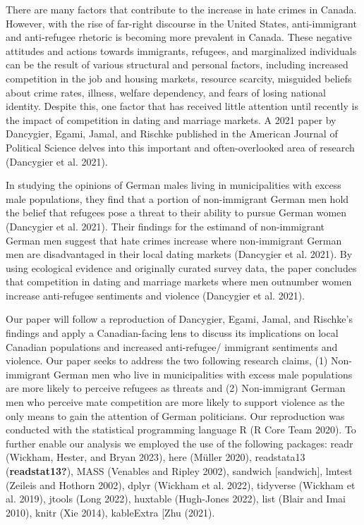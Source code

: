 \documentclass[
]{article}
\begin{document}
There are many factors that contribute to the increase in hate crimes in
Canada. However, with the rise of far-right discourse in the United
States, anti-immigrant and anti-refugee rhetoric is becoming more
prevalent in Canada. These negative attitudes and actions towards
immigrants, refugees, and marginalized individuals can be the result of
various structural and personal factors, including increased competition
in the job and housing markets, resource scarcity, misguided beliefs
about crime rates, illness, welfare dependency, and fears of losing
national identity. Despite this, one factor that has received little
attention until recently is the impact of competition in dating and
marriage markets. A 2021 paper by Dancygier, Egami, Jamal, and Rischke
published in the American Journal of Political Science delves into this
important and often-overlooked area of research (Dancygier et al. 2021).

In studying the opinions of German males living in municipalities with
excess male populations, they find that a portion of non-immigrant
German men hold the belief that refugees pose a threat to their ability
to pursue German women (Dancygier et al. 2021). Their findings for the
estimand of non-immigrant German men suggest that hate crimes increase
where non-immigrant German men are disadvantaged in their local dating
markets (Dancygier et al. 2021). By using ecological evidence and
originally curated survey data, the paper concludes that competition in
dating and marriage markets where men outnumber women increase
anti-refugee sentiments and violence (Dancygier et al. 2021).

Our paper will follow a reproduction of Dancygier, Egami, Jamal, and
Rischke's findings and apply a Canadian-facing lens to discuss its
implications on local Canadian populations and increased anti-refugee/
immigrant sentiments and violence. Our paper seeks to address the two
following research claims, (1) Non-immigrant German men who live in
municipalities with excess male populations are more likely to perceive
refugees as threats and (2) Non-immigrant German men who perceive mate
competition are more likely to support violence as the only means to
gain the attention of German politicians. Our reproduction was conducted
with the statistical programming language R (R Core Team 2020). To
further enable our analysis we employed the use of the following
packages: readr (Wickham, Hester, and Bryan 2023), here (Müller 2020),
readstata13 (\textbf{readstat13?}), MASS (Venables and Ripley 2002),
sandwich {[}sandwich{]}, lmtest (Zeileis and Hothorn 2002), dplyr
(Wickham et al. 2022), tidyverse (Wickham et al. 2019), jtools (Long
2022), huxtable (Hugh-Jones 2022), list (Blair and Imai 2010), knitr
(Xie 2014), kableExtra {[}Zhu (2021).
\end{document}
